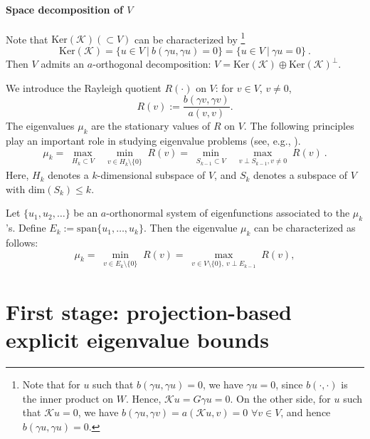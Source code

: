 \documentclass[a4,11pt]{article}
\numberwithin{equation}{section}
\begin{document}
\paragraph{\bf Space decomposition of $V$}
Note that 
$\mbox{Ker}( \mathcal{K}  ) (\subset V)$ can be characterized by \footnote{Note that for $u$ such that $b(\gamma u, \gamma u)=0$, we have $\gamma u=0$, since $b(\cdot,\cdot)$ is the inner product on  $W$. Hence,  $\mathcal{K} u =G \gamma u=0$. On the other side, for $u$ such that $\mathcal{K} u=0$, we have
$b(\gamma u, \gamma  v)= a(\mathcal{K} u, v)=0$ $ \forall v\in V$, and hence 
$b(\gamma u, \gamma  u)=0$. }
$$
\mbox{Ker}( \mathcal{K}  ) = \{u \in V \:|\: b(\gamma u, \gamma u) =0 \} = \{u \in V \:|\: \gamma u =0 \}\:.
$$
Then $V$ admits an $a$-orthogonal decomposition:
$V = \mbox{Ker}(\mathcal{K} ) \oplus  \mbox{Ker} (\mathcal{K} )^\perp
$. 

\medskip

We  introduce the Rayleigh quotient $R(\cdot)$ on  $V$: for $v\in V$, $v\neq 0$,
\begin{equation}
\label{eq:rayleigh_quotient}
R(v):=\frac{b(\gamma v,\gamma v)}{a(v,v)}.
\end{equation}
The eigenvalues $\mu_k$ are the stationary values of $R$ on $V$.
The following  principles play an important role in studying eigenvalue problems (see, e.g., \cite{kato1966, weinberger1974variational,nakao1999numerical}).
  \begin{equation}
   \label{eq:min-max-eig-subspace}
    \mu_{k}=\max_{\substack{H_{k}\subset V}}~\min_{\substack{v\in H_{k}\setminus \{0\}}}R(v)=
	\min_{\substack{S_{k-1}\subset V}} ~\max_{\substack{v\perp S_{k-1},v\neq 0}} R(v)~.
  \end{equation}
Here, $H_k$ denotes a $k$-dimensional subspace of $V$, and
 $S_{k}$ denotes a subspace of $V$  with $\mbox{dim}(S_{k}) \le k$. 

Let $\{u_1,u_2, \ldots\}$ be an $a$-orthonormal system of eigenfunctions associated to the $\mu_{k}$'s. 
Define $E_{k}:=\mbox{span}\{u_1, \ldots, u_k\}$.
Then the eigenvalue $\mu_k$ can be characterized as follows:
\begin{equation}
	\mu_{k}=\min_{\substack{v\in E_{k}\setminus \{0\}}}R(v) = \max_{\substack{v\in V\setminus \{0\}, ~v\perp E_{k-1}}} R(v), 
  \label{eq:min-max-eigen-subspace}
\end{equation}


\section{{First stage:} projection-based  explicit eigenvalue bounds}
\end{document}
